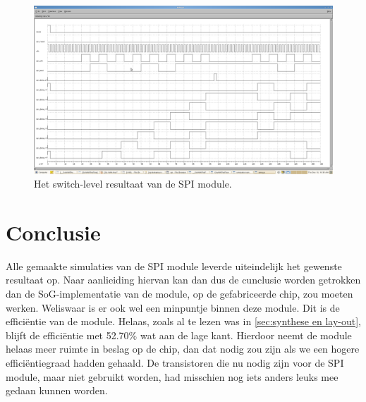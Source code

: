 \documentclass{scrartcl} %
\begin{document}
\begin{figure}[H]
	\centering
	\includegraphics[width=\textwidth]{resource/switchlevelSPI.png}
	\caption{Het switch-level resultaat van de SPI module.}
	\label{fig:switchlevelSPI}
\end{figure}

\section{Conclusie}
Alle gemaakte simulaties van de SPI module leverde uiteindelijk het gewenste resultaat op. Naar aanlieiding hiervan kan dan dus de cunclusie worden getrokken dan de SoG-implementatie van de module, op de gefabriceerde chip, zou moeten werken. Weliswaar is er ook wel een minpuntje binnen deze module. Dit is de effici\"entie van de module. Helaas, zoals al te lezen was in \ref{sec:synthese en lay-out}, blijft de effici\"entie met 52.70\% wat aan de lage kant. Hierdoor neemt de module helaas meer ruimte in beslag op de chip, dan dat nodig zou zijn als we een hogere effici\"entiegraad hadden gehaald. De transistoren die nu nodig zijn voor de SPI module, maar niet gebruikt worden, had misschien nog iets anders leuks mee gedaan kunnen worden. 
\end{document}

